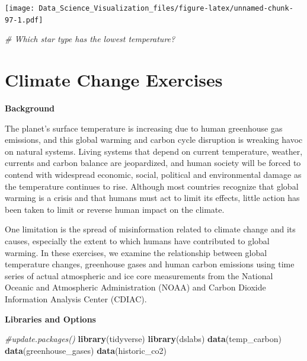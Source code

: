 \documentclass[
]{article}
\newenvironment{Shaded}{\begin{snugshade}}{\end{snugshade}}
\newcommand{\CommentTok}[1]{\textcolor[rgb]{0.56,0.35,0.01}{\textit{#1}}}
\newcommand{\KeywordTok}[1]{\textcolor[rgb]{0.13,0.29,0.53}{\textbf{#1}}}
\newcommand{\NormalTok}[1]{#1}
\begin{document}
\texttt{[image: Data\_Science\_Visualization\_files/figure-latex/unnamed-chunk-97-1.pdf]}

\begin{Shaded}
\begin{Highlighting}[]
\CommentTok{# Which star type has the lowest temperature?}
\end{Highlighting}
\end{Shaded}

\hypertarget{climate-change-exercises}{%
\section{Climate Change Exercises}\label{climate-change-exercises}}

\textbf{Background}

The planet's surface temperature is increasing due to human greenhouse
gas emissions, and this global warming and carbon cycle disruption is
wreaking havoc on natural systems. Living systems that depend on current
temperature, weather, currents and carbon balance are jeopardized, and
human society will be forced to contend with widespread economic,
social, political and environmental damage as the temperature continues
to rise. Although most countries recognize that global warming is a
crisis and that humans must act to limit its effects, little action has
been taken to limit or reverse human impact on the climate.

One limitation is the spread of misinformation related to climate change
and its causes, especially the extent to which humans have contributed
to global warming. In these exercises, we examine the relationship
between global temperature changes, greenhouse gases and human carbon
emissions using time series of actual atmospheric and ice core
measurements from the National Oceanic and Atmospheric Administration
(NOAA) and Carbon Dioxide Information Analysis Center (CDIAC).

\textbf{Libraries and Options}

\begin{Shaded}
\begin{Highlighting}[]
\CommentTok{#update.packages()}
\KeywordTok{library}\NormalTok{(tidyverse)}
\KeywordTok{library}\NormalTok{(dslabs)}
\KeywordTok{data}\NormalTok{(temp_carbon)}
\KeywordTok{data}\NormalTok{(greenhouse_gases)}
\KeywordTok{data}\NormalTok{(historic_co2)}
\end{Highlighting}
\end{Shaded}
\end{document}
